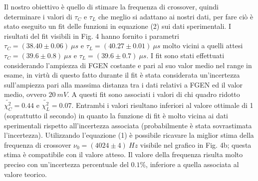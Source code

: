 \documentclass[12pt]{article}
\begin{document}
Il nostro obiettivo è quello di stimare la frequenza di crossover, quindi determinare i valori di $\tau_C$ e $\tau_L$ che meglio si adattano ai nostri dati, per fare ciò
è stato eseguito un fit delle funzioni in equazione (2) sui dati sperimentali. I risultati del fit visibili in Fig. 4 hanno fornito i parametri $\tau_C=(38.40\pm0.06) \ \mu s $ e $\tau_L=(40.27\pm0.01) \ \mu s $ 
molto vicini a quelli attesi $\tau_C=(39.6\pm0.8) \ \mu s $ e $\tau_L=(39.6\pm0.7) \ \mu s $.
I fit sono stati effettuati considerando l'ampiezza di FGEN costante e pari al suo valor medio nel range in esame, in virtù di questo fatto durante il fit è stata considerata un'incertezza sull'ampiezza 
pari alla massima distanza tra i dati relativi a FGEN ed il valor medio, ovvero $20 \ mV$. A questi fit sono associati i valori di chi quadro ridotto $\tilde{\chi^2_C}=0.44$ e $\tilde{\chi^2_L}=0.07$. Entrambi i valori
risultano inferiori al valore ottimale di 1 (soprattutto il secondo) in quanto la funzione di fit è molto vicina ai dati sperimentali rispetto all'incertezza associata (probabilmente è stata sovrastimata l'incertezza).
Utilizzando l'equazione (1) è possibile ricavare la miglior stima della frequenza di crossover $\nu_0=(4024 \pm 4) \ Hz$ visibile nel grafico in Fig. 4b; questa stima è compatibile con il valore atteso. Il valore della frequenza 
risulta molto preciso con un'incertezza percentuale del $0.1\%$, inferiore a quella associata al valore teorico.
\end{document}
